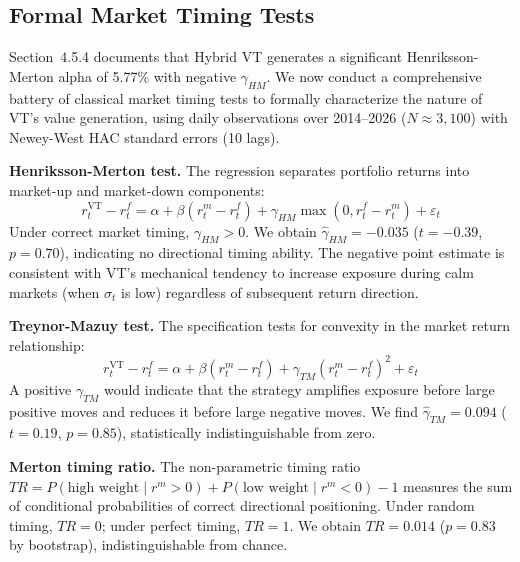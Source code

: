 
\subsection{Formal Market Timing Tests}
\label{sec:timing_tests}

Section~4.5.4 documents that Hybrid VT generates a significant Henriksson-Merton alpha of 5.77\% with negative $\gamma_{HM}$. We now conduct a comprehensive battery of classical market timing tests to formally characterize the nature of VT's value generation, using daily observations over 2014--2026 ($N \approx 3{,}100$) with Newey-West HAC standard errors (10 lags).

\textbf{Henriksson-Merton test.} The \citet{henriksson1981} regression separates portfolio returns into market-up and market-down components:
\begin{equation}
r^{\text{VT}}_t - r^f_t = \alpha + \beta (r^m_t - r^f_t) + \gamma_{HM} \max(0, r^f_t - r^m_t) + \varepsilon_t
\end{equation}
Under correct market timing, $\gamma_{HM} > 0$. We obtain $\hat{\gamma}_{HM} = -0.035$ ($t = -0.39$, $p = 0.70$), indicating no directional timing ability. The negative point estimate is consistent with VT's mechanical tendency to increase exposure during calm markets (when $\hat{\sigma}_t$ is low) regardless of subsequent return direction.

\textbf{Treynor-Mazuy test.} The \citet{treynor1966} specification tests for convexity in the market return relationship:
\begin{equation}
r^{\text{VT}}_t - r^f_t = \alpha + \beta (r^m_t - r^f_t) + \gamma_{TM} (r^m_t - r^f_t)^2 + \varepsilon_t
\end{equation}
A positive $\gamma_{TM}$ would indicate that the strategy amplifies exposure before large positive moves and reduces it before large negative moves. We find $\hat{\gamma}_{TM} = 0.094$ ($t = 0.19$, $p = 0.85$), statistically indistinguishable from zero.

\textbf{Merton timing ratio.} The non-parametric \citet{henriksson1981} timing ratio $TR = P(\text{high weight} \mid r^m > 0) + P(\text{low weight} \mid r^m < 0) - 1$ measures the sum of conditional probabilities of correct directional positioning. Under random timing, $TR = 0$; under perfect timing, $TR = 1$. We obtain $TR = 0.014$ ($p = 0.83$ by bootstrap), indistinguishable from chance.

